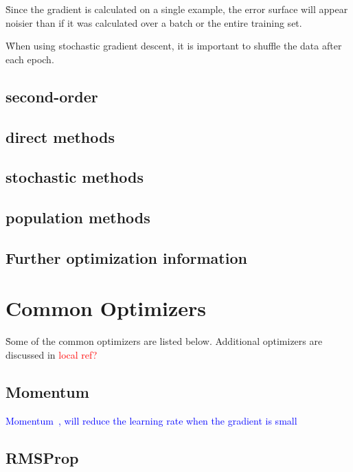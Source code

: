 \r{Since the gradient is calculated on a single example, the error surface will appear noisier than if it was calculated over a batch or the entire training set.}

\r{When using stochastic gradient descent, it is important to shuffle the data after each epoch.}



\subsection{second-order}

\subsection{direct methods}

\subsection{stochastic methods}

\subsection{population methods}

\subsection{Further optimization information}


\section{Common Optimizers}

\r{Some of the common optimizers are listed below. Additional optimizers are discussed in \textcolor{red}{local ref?}}

\subsection{Momentum}

\textcolor{blue}{Momentum~\cite{qian1999momentum}, will reduce the learning rate when the gradient is small}

\subsection{RMSProp}


